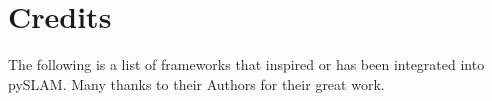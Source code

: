 \documentclass{article}
\begin{document}



\hypertarget{credits}{%
\section{Credits}\label{credits}}

The following is a list of frameworks that inspired or has been integrated into pySLAM. Many thanks to their Authors for their great work.
\end{document}
